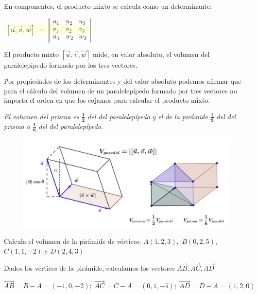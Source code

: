 En componentes, el producto mixto se calcula como un determinante:

\vspace{2mm}\centerline{\colorbox{LightYellow}{$\; [\overrightarrow { u } ,\overrightarrow { v }, \overrightarrow { w }]  \; =\; \left| \begin{matrix} u_{ 1 } & u_{ 2 } & u_{ 3 } \\ v_{ 1 } & v_{ 2 } & v_{ 3 } \\ w_{ 1 } & w_{ 2 } & w_{ 3 } \end{matrix} \right|\; $}}

\vspace{2mm}El producto mixto $[\vec u, \vec v, \vec w]$ mide, en valor absoluto, el volumen del paralelepípedo formado por los tres vectores.

Por propiedades de los determinantes y del valor absoluto podemos afirmar que para el cálculo del volumen de un paralelepípedo formado por tres vectores no importa el orden en que los cojamos para calcular el producto mixto.

\textit{El volumen del prisma es $\boldsymbol{ \frac 1 2 }$ del del paralelepípedo y el de la pirámide $\boldsymbol{ \frac 1 3 }$ del del prisma o $\boldsymbol{ \frac 1 6 }$ del del paralelepípedo.} 


	\begin{figure}[H]
	\centering
	\includegraphics[width=1\textwidth]{imagenes/imagenes09/T09IM24.png}
	\end{figure}
\justify	
\begin{ejem}
Calcula el volumen de la pirámide de vértices: $A(1,2,3),$ $B(0,2,5),$  $C(1,1,-2)$ y $D(2,4,3)$	
\end{ejem}

\noindent Dados los vértices de la pirámide, calculamos los vectores $\overrightarrow{AB}, \overrightarrow{AC}, \overrightarrow{AD}$

\noindent $\overrightarrow{AB}=B-A=(-1,0,-2); \; \overrightarrow{AC}=C-A=(0,1,-5); \; \overrightarrow{AD}=D-A=(1,2,0)$

